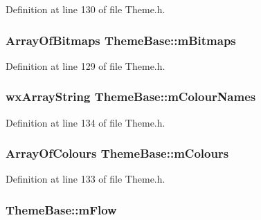 Definition at line 130 of file Theme.\+h.

\subsubsection[{\texorpdfstring{m\+Bitmaps}{mBitmaps}}]{\setlength{\rightskip}{0pt plus 5cm}Array\+Of\+Bitmaps Theme\+Base\+::m\+Bitmaps\hspace{0.3cm}{\ttfamily [protected]}}\hypertarget{class_theme_base_aa51a6086228b2a0c910f844d783796b1}{}\label{class_theme_base_aa51a6086228b2a0c910f844d783796b1}


Definition at line 129 of file Theme.\+h.

\subsubsection[{\texorpdfstring{m\+Colour\+Names}{mColourNames}}]{\setlength{\rightskip}{0pt plus 5cm}wx\+Array\+String Theme\+Base\+::m\+Colour\+Names\hspace{0.3cm}{\ttfamily [protected]}}\hypertarget{class_theme_base_ab45c41c4dcbb88987cffd3102f3e6329}{}\label{class_theme_base_ab45c41c4dcbb88987cffd3102f3e6329}


Definition at line 134 of file Theme.\+h.

\subsubsection[{\texorpdfstring{m\+Colours}{mColours}}]{\setlength{\rightskip}{0pt plus 5cm}Array\+Of\+Colours Theme\+Base\+::m\+Colours\hspace{0.3cm}{\ttfamily [protected]}}\hypertarget{class_theme_base_aa9603212739c339d9c3a45045117f8ac}{}\label{class_theme_base_aa9603212739c339d9c3a45045117f8ac}


Definition at line 133 of file Theme.\+h.

\subsubsection[{\texorpdfstring{m\+Flow}{mFlow}}]{ Theme\+Base\+::m\+Flow\hspace{0.3cm}{\ttfamily [protected]}}\hypertarget{class_theme_base_a88a7198ddbcc667515acb041603cd48b}{}\label{class_theme_base_a88a7198ddbcc667515acb041603cd48b}


